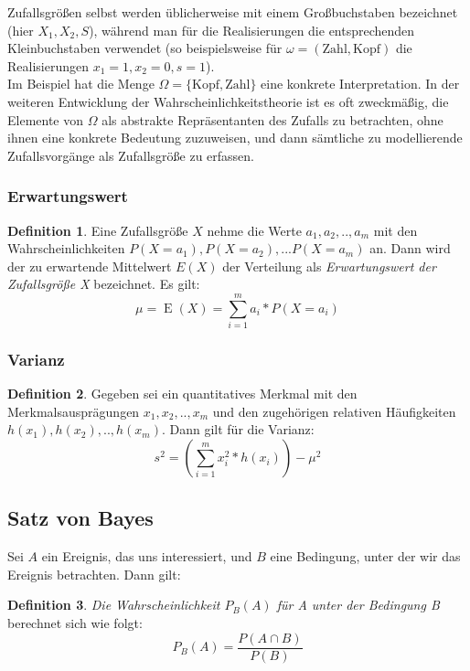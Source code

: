 \documentclass[a4paper,10pt,DIV9, BCOR12mm, oneside,openright,openbib]{scrreprt}
\theoremstyle{definition}
\newtheorem{mydef}{Definition}[section]
\theoremstyle{plain}
\begin{document}
Zufallsgrößen selbst werden üblicherweise mit einem Großbuchstaben bezeichnet (hier $ X_1, X_2, S $), während man für die Realisierungen die entsprechenden Kleinbuchstaben verwendet (so beispielsweise für $ \omega=\left(\text{Zahl},\text{Kopf}\right) $ die Realisierungen $ x_1 = 1, x_2=0, s=1 $).\\
Im Beispiel hat die Menge $ \Omega = \{\text{Kopf}, \text{Zahl}\} $ eine konkrete Interpretation. In der weiteren Entwicklung der Wahrscheinlichkeitstheorie ist es oft zweckmäßig, die Elemente von $ \Omega $ als abstrakte Repräsentanten des Zufalls zu betrachten, ohne ihnen eine konkrete Bedeutung zuzuweisen, und dann sämtliche zu modellierende Zufallsvorgänge als Zufallsgröße zu erfassen.\\

\subsubsection{Erwartungswert}
\begin{mydef}
Eine Zufallsgröße $X$ nehme die Werte $ a_1, a_2, .. , a_m  $ mit den Wahrscheinlichkeiten $ P(X=a_1), P(X=a_2), ... P(X=a_m) $ an. Dann wird der zu erwartende Mittelwert $ E(X) $ der Verteilung als \textit{Erwartungswert der Zufallsgröße X} bezeichnet. Es gilt:
\[ \mu = \operatorname{E}(X)=\sum_{i=1}^m a_i * P(X=a_i)  \]
\end{mydef}

\subsubsection{Varianz}
\begin{mydef}
Gegeben sei ein quantitatives Merkmal mit den Merkmalsausprägungen $ x_1, x_2, .., x_m $ und den zugehörigen relativen Häufigkeiten $ h(x_1), h(x_2), .., h(x_m) $. Dann gilt für die Varianz:
\[ s^2=(\sum_{i=1}^m x_i^2 * h(x_i))- \mu^2  \]
\end{mydef}

\subsection{Satz von Bayes}
Sei $A$ ein Ereignis, das uns interessiert, und $B$ eine Bedingung, unter der wir das Ereignis betrachten. Dann gilt:
\begin{mydef}
\textit{Die Wahrscheinlichkeit $ P_{B}(A) $ für A unter der Bedingung B} berechnet sich wie folgt: 
\[ P_{B}(A) = \frac{P(A \cap{B})}{P(B)} \] 
\end{mydef}
\end{document}
